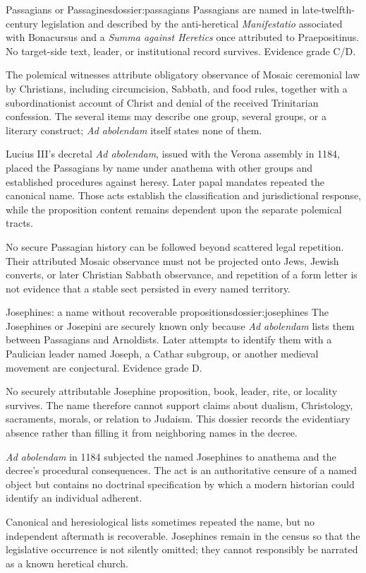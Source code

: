 \begin{heresydossier}{Passagians or Passagines}{dossier:passagians}
\objectfield Passagians are named in late-twelfth-century legislation and described by the anti-heretical \emph{Manifestatio} associated with Bonacursus and a \emph{Summa against Heretics} once attributed to Praepositinus. No target-side text, leader, or institutional record survives. Evidence grade C/D.

\propositionfield The polemical witnesses attribute obligatory observance of Mosaic ceremonial law by Christians, including circumcision, Sabbath, and food rules, together with a subordinationist account of Christ and denial of the received Trinitarian confession. The several items may describe one group, several groups, or a literary construct; \emph{Ad abolendam} itself states none of them.

\responsefield Lucius III's decretal \emph{Ad abolendam}, issued with the Verona assembly in 1184, placed the Passagians by name under anathema with other groups and established procedures against heresy. Later papal mandates repeated the canonical name. Those acts establish the classification and jurisdictional response, while the proposition content remains dependent upon the separate polemical tracts.

\aftermathfield No secure Passagian history can be followed beyond scattered legal repetition. Their attributed Mosaic observance must not be projected onto Jews, Jewish converts, or later Christian Sabbath observance, and repetition of a form letter is not evidence that a stable sect persisted in every named territory.
\end{heresydossier}

\begin{heresydossier}{Josephines: a name without recoverable propositions}{dossier:josephines}
\objectfield The Josephines or Josepini are securely known only because \emph{Ad abolendam} lists them between Passagians and Arnoldists. Later attempts to identify them with a Paulician leader named Joseph, a Cathar subgroup, or another medieval movement are conjectural. Evidence grade D.

\propositionfield No securely attributable Josephine proposition, book, leader, rite, or locality survives. The name therefore cannot support claims about dualism, Christology, sacraments, morals, or relation to Judaism. This dossier records the evidentiary absence rather than filling it from neighboring names in the decree.

\responsefield \emph{Ad abolendam} in 1184 subjected the named Josephines to anathema and the decree's procedural consequences. The act is an authoritative censure of a named object but contains no doctrinal specification by which a modern historian could identify an individual adherent.

\aftermathfield Canonical and heresiological lists sometimes repeated the name, but no independent aftermath is recoverable. Josephines remain in the census so that the legislative occurrence is not silently omitted; they cannot responsibly be narrated as a known heretical church.
\end{heresydossier}

